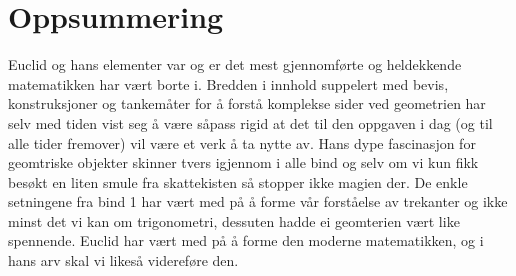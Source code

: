 \documentclass[12pt,
               a4paper,
               article,
               oneside,
               oldfontcommands,
               norsk]{memoir}
\begin{document}
\section*{\centering Oppsummering}
Euclid og hans elementer var og er det mest gjennomførte og heldekkende matematikken har vært borte i. Bredden i innhold suppelert med bevis, konstruksjoner og tankemåter for å forstå komplekse sider ved geometrien har selv med tiden vist seg å være såpass rigid at det til den oppgaven i dag (og til alle tider fremover) vil være et verk å ta nytte av. Hans dype fascinasjon for geomtriske objekter skinner tvers igjennom i alle bind og selv om vi kun fikk besøkt en liten smule fra skattekisten så stopper ikke magien der. De enkle setningene fra bind 1 har vært med på å forme vår forståelse av trekanter og ikke minst det vi kan om trigonometri, dessuten hadde ei geomterien vært like spennende. Euclid har vært med på å forme den moderne matematikken, og i hans arv skal vi likeså videreføre den.

\end{document}
